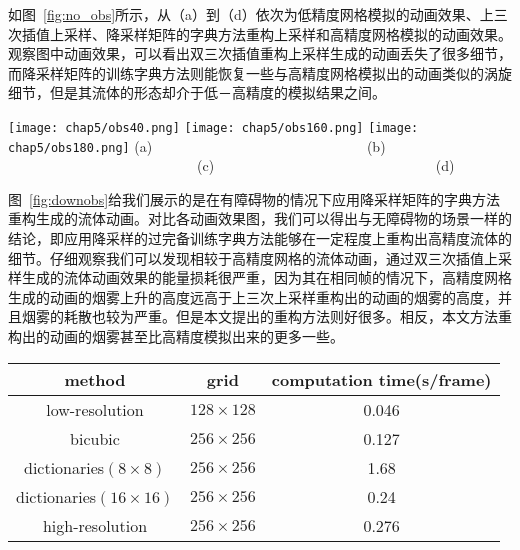 如图~\ref{fig:no_obs}所示，从（a）到（d）依次为低精度网格模拟的动画效果、上三次插值上采样、降采样矩阵的字典方法重构上采样和高精度网格模拟的动画效果。观察图中动画效果，可以看出双三次插值重构上采样生成的动画丢失了很多细节，而降采样矩阵的训练字典方法则能恢复一些与高精度网格模拟出的动画类似的涡旋细节，但是其流体的形态却介于低－高精度的模拟结果之间。

\begin{figure*}
 \center
 \texttt{[image: chap5/obs40.png]}
 \texttt{[image: chap5/obs160.png]}
 \newline \texttt{[image: chap5/obs180.png]}
\newline  (a) \ \ \ \ \ \ \ \ \ \ \ \ \ \ \ \ \ \ \ \ \ \ \ \ \ \ \ \ \ \ (b) \ \ \ \ \ \ \ \ \ \ \ \ \ \ \ \ \ \ \ \ \ \ \ \ \ \ \ (c) \ \ \ \ \ \ \ \ \ \ \ \ \ \ \ \ \ \ \ \ \ \ \ \ \ \ \ \ \ \ \ (d)
\end{figure*}

图~\ref{fig:downobs}给我们展示的是在有障碍物的情况下应用降采样矩阵的字典方法重构生成的流体动画。对比各动画效果图，我们可以得出与无障碍物的场景一样的结论，即应用降采样的过完备训练字典方法能够在一定程度上重构出高精度流体的细节。仔细观察我们可以发现相较于高精度网格的流体动画，通过双三次插值上采样生成的流体动画效果的能量损耗很严重，因为其在相同帧的情况下，高精度网格生成的动画的烟雾上升的高度远高于上三次上采样重构出的动画的烟雾的高度，并且烟雾的耗散也较为严重。但是本文提出的重构方法则好很多。相反，本文方法重构出的动画的烟雾甚至比高精度模拟出来的更多一些。

\begin{table}
  \centering
 \begin{tabular}{|c|c|c|} %
 \hline %
 \textbf{method} & \textbf{grid} & \textbf{computation time(s/frame)} \\
 \hline
low-resolution  &  \(128 \times 128\) & 0.046 \\
 \hline
bicubic   & \(256 \times 256\)  &  0.127 \\
 \hline
dictionaries\((8 \times 8)\) & \(256 \times 256\) &  1.68 \\
 \hline
 dictionaries\((16 \times 16)\) &  \(256 \times 256\) &  0.24 \\
 \hline
 high-resolution  &  \(256 \times 256\) &  0.276 \\
\hline
\end{tabular}
\end{table}

